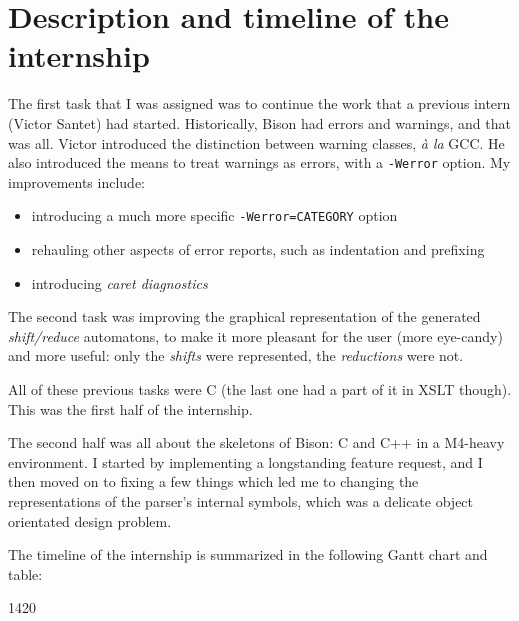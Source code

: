\documentclass[a4paper,11pt,final]{article}
\begin{document}
  \section*{Description and timeline of the internship}

  The first task that I was assigned was to continue the work that a previous
  intern (Victor Santet) had started. Historically, Bison had errors and
  warnings, and that was all. Victor introduced the distinction between
  warning classes, \textit{à la} GCC\@. He also introduced the means to treat
  warnings as errors, with a \texttt{-Werror} option. My improvements include:
  \begin{itemize}
    \item introducing a much more specific \texttt{-Werror=CATEGORY} option
    \item rehauling other aspects of error reports, such as indentation and
      prefixing
    \item introducing \textit{caret diagnostics}
  \end{itemize}

  The second task was improving the graphical representation of the generated
  \textit{shift/reduce} automatons, to make it more pleasant for the user (more
  eye-candy) and more useful: only the \textit{shifts} were represented, the
  \textit{reductions} were not.

  All of these previous tasks were C (the last one had a part of it in XSLT
  though). This was the first half of the internship.

  The second half was all about the skeletons of Bison: C and C++ in a M4-heavy
  environment. I started by implementing a longstanding feature request, and I
  then moved on to fixing a few things which led me to changing the
  representations of the parser's internal symbols, which was a delicate object
  orientated design problem.

  The timeline of the internship is summarized in the following Gantt chart and
  table:

  \begin{adjustwidth}{-4cm}{-2cm}
  \begin{gantt}[xunitlength=0.7cm,fontsize=\small,titlefontsize=\small,drawledgerline=true]{14}{20}
    \begin{ganttitle}
    \end{ganttitle}
    \begin{ganttitle}
    \end{ganttitle}
    \begin{ganttitle}
    \end{ganttitle}
  \end{gantt}
  \end{adjustwidth}
\end{document}
